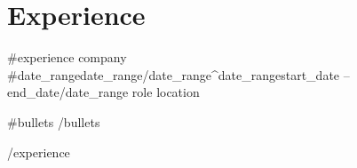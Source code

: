 \vspace{-10pt}
\section{Experience}
\resumeSubHeadingListStart
{{#experience}}
    \resumeSubheading
    { {{{company}}} }{ {{#date_range}}{{{date_range}}}{{/date_range}}{{^date_range}}{{{start_date}}} -- {{{end_date}}}{{/date_range}} }
    { {{{role}}} }{ {{{location}}} }
    \begin{itemize}
{{#bullets}}
{{/bullets}}
    \end{itemize}
{{/experience}}
\resumeSubHeadingListEnd